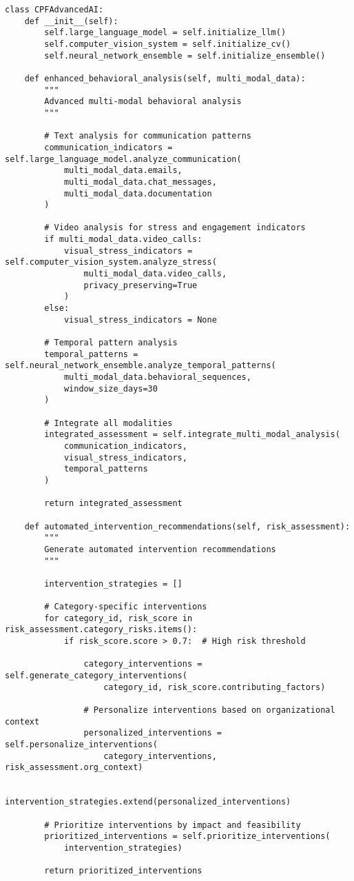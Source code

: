 \documentclass[10pt,twocolumn]{IEEEtran}
\begin{document}
\begin{lstlisting}[caption={Future AI Enhancement Architecture}]
class CPFAdvancedAI:
    def __init__(self):
        self.large_language_model = self.initialize_llm()
        self.computer_vision_system = self.initialize_cv()
        self.neural_network_ensemble = self.initialize_ensemble()
        
    def enhanced_behavioral_analysis(self, multi_modal_data):
        """
        Advanced multi-modal behavioral analysis
        """
        
        # Text analysis for communication patterns
        communication_indicators = self.large_language_model.analyze_communication(
            multi_modal_data.emails,
            multi_modal_data.chat_messages,
            multi_modal_data.documentation
        )
        
        # Video analysis for stress and engagement indicators
        if multi_modal_data.video_calls:
            visual_stress_indicators = self.computer_vision_system.analyze_stress(
                multi_modal_data.video_calls,
                privacy_preserving=True
            )
        else:
            visual_stress_indicators = None
        
        # Temporal pattern analysis
        temporal_patterns = self.neural_network_ensemble.analyze_temporal_patterns(
            multi_modal_data.behavioral_sequences,
            window_size_days=30
        )
        
        # Integrate all modalities
        integrated_assessment = self.integrate_multi_modal_analysis(
            communication_indicators,
            visual_stress_indicators,
            temporal_patterns
        )
        
        return integrated_assessment
    
    def automated_intervention_recommendations(self, risk_assessment):
        """
        Generate automated intervention recommendations
        """
        
        intervention_strategies = []
        
        # Category-specific interventions
        for category_id, risk_score in risk_assessment.category_risks.items():
            if risk_score.score > 0.7:  # High risk threshold
                
                category_interventions = self.generate_category_interventions(
                    category_id, risk_score.contributing_factors)
                
                # Personalize interventions based on organizational context
                personalized_interventions = self.personalize_interventions(
                    category_interventions, risk_assessment.org_context)
                
                intervention_strategies.extend(personalized_interventions)
        
        # Prioritize interventions by impact and feasibility
        prioritized_interventions = self.prioritize_interventions(
            intervention_strategies)
        
        return prioritized_interventions
\end{lstlisting}
\end{document}
